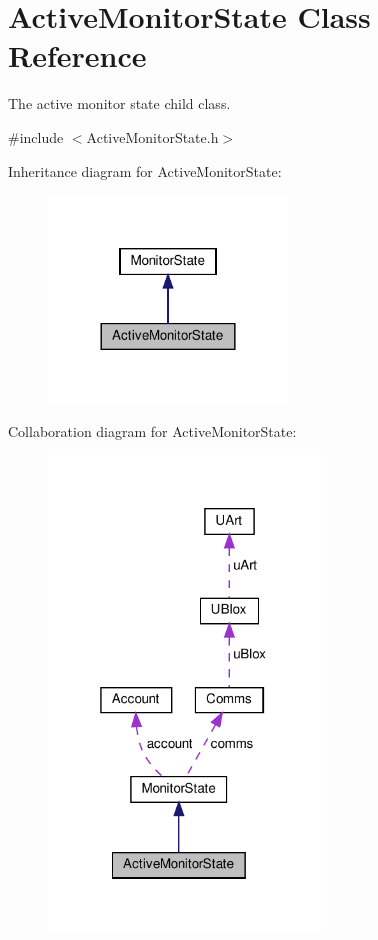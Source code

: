 \hypertarget{class_active_monitor_state}{}\section{Active\+Monitor\+State Class Reference}
\label{class_active_monitor_state}


The active monitor state child class.  




{\ttfamily \#include $<$Active\+Monitor\+State.\+h$>$}



Inheritance diagram for Active\+Monitor\+State\+:
\nopagebreak
\begin{figure}[H]
\begin{center}
\leavevmode
\includegraphics[width=180pt]{dd/d2b/class_active_monitor_state__inherit__graph}
\end{center}
\end{figure}


Collaboration diagram for Active\+Monitor\+State\+:
\nopagebreak
\begin{figure}[H]
\begin{center}
\leavevmode
\includegraphics[width=205pt]{d5/d71/class_active_monitor_state__coll__graph}
\end{center}
\end{figure}
